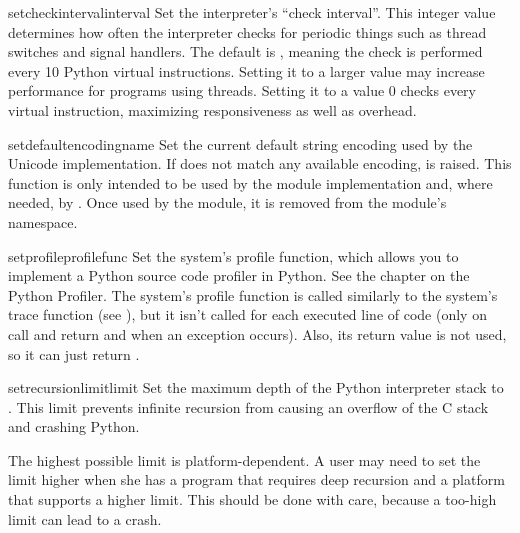 \begin{funcdesc}{setcheckinterval}{interval}
Set the interpreter's ``check interval''.  This integer value
determines how often the interpreter checks for periodic things such
as thread switches and signal handlers.  The default is , meaning
the check is performed every 10 Python virtual instructions.  Setting
it to a larger value may increase performance for programs using
threads.  Setting it to a value \code{<=} 0 checks every virtual instruction,
maximizing responsiveness as well as overhead.
\end{funcdesc}

\begin{funcdesc}{setdefaultencoding}{name}
  Set the current default string encoding used by the Unicode
  implementation.  If  does not match any available
  encoding,  is raised.  This function is only
  intended to be used by the  module implementation
  and, where needed, by .  Once used by the
   module, it is removed from the 
  module's namespace.
\end{funcdesc}

\begin{funcdesc}{setprofile}{profilefunc}
  Set the system's profile function, which allows you to implement a
  Python source code profiler in Python.  See the chapter on the
  Python Profiler.  The system's profile function
  is called similarly to the system's trace function (see
  ), but it isn't called for each executed line of
  code (only on call and return and when an exception occurs).  Also,
  its return value is not used, so it can just return .
\end{funcdesc}

\begin{funcdesc}{setrecursionlimit}{limit}
Set the maximum depth of the Python interpreter stack to .
This limit prevents infinite recursion from causing an overflow of the
C stack and crashing Python.  

The highest possible limit is platform-dependent.  A user may need to
set the limit higher when she has a program that requires deep
recursion and a platform that supports a higher limit.  This should be
done with care, because a too-high limit can lead to a crash.
\end{funcdesc}

